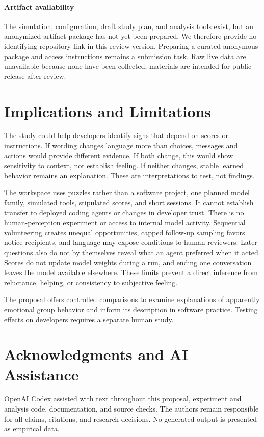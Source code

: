 \documentclass[10pt,conference]{IEEEtran}
\begin{document}
\paragraph{Artifact availability}
The simulation, configuration, draft study plan, and analysis tools exist, but an anonymized artifact package has not yet been prepared. We therefore provide no identifying repository link in this review version. Preparing a curated anonymous package and access instructions remains a submission task. Raw live data are unavailable because none have been collected; materials are intended for public release after review.

\section{Implications and Limitations}

The study could help developers identify signs that depend on scores or instructions. If wording changes language more than choices, messages and actions would provide different evidence. If both change, this would show sensitivity to context, not establish feeling. If neither changes, stable learned behavior remains an explanation. These are interpretations to test, not findings.

The workspace uses puzzles rather than a software project, one planned model family, simulated tools, stipulated scores, and short sessions. It cannot establish transfer to deployed coding agents or changes in developer trust. There is no human-perception experiment or access to internal model activity. Sequential volunteering creates unequal opportunities, capped follow-up sampling favors notice recipients, and language may expose conditions to human reviewers. Later questions also do not by themselves reveal what an agent preferred when it acted. Scores do not update model weights during a run, and ending one conversation leaves the model available elsewhere. These limits prevent a direct inference from reluctance, helping, or consistency to subjective feeling.

The proposal offers controlled comparisons to examine explanations of apparently emotional group behavior and inform its description in software practice. Testing effects on developers requires a separate human study.

\section*{Acknowledgments and AI Assistance}
OpenAI Codex \cite{openai2026codex} assisted with text throughout this proposal, experiment and analysis code, documentation, and source checks. The authors remain responsible for all claims, citations, and research decisions. No generated output is presented as empirical data.



\end{document}
